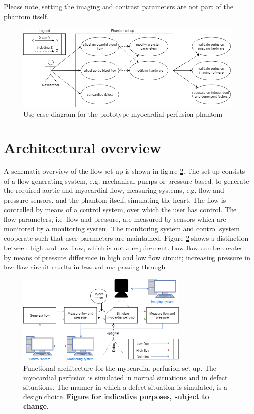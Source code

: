 Please note, setting the imaging and contrast parameters are not part of the phantom itself. 
\begin{figure}[!h]
	\includegraphics[width=\textwidth]{./images/usecase_diagram.png}
	\caption{Use case diagram for the prototype myocardial perfusion phantom}
	\label{fig:usecase}
\end{figure}

\section{Architectural overview}
A schematic overview of the flow set-up is shown in figure \ref{fig:funcarch}. The set-up consists of a flow generating system, e.g. mechanical pumps or pressure based, to generate the required aortic and myocardial flow, measuring systems, e.g. flow and pressure sensors, and the phantom itself, simulating the heart. The flow is controlled by means of a control system, over which the user has control. The flow parameters, i.e. flow and pressure, are measured by sensors which are monitored by a monitoring system. The monitoring system and control system cooperate such that user parameters are maintained. Figure \ref{fig:funcarch} shows a distinction between high and low flow, which is not a requirement. Low flow can be created by means of pressure difference in high and low flow circuit; increasing pressure in low flow circuit results in less volume passing through.
\begin{figure}
	\includegraphics[width=0.75\textwidth]{./images/functional_architecture.png}
	\caption{Functional architecture for the myocardial perfusion set-up. The myocardial perfusion is simulated in normal situations and in defect situations. The manner in which a defect situation is simulated, is a design choice. \textbf{Figure for indicative purposes, subject to change}.}
	\label{fig:funcarch}
\end{figure}
